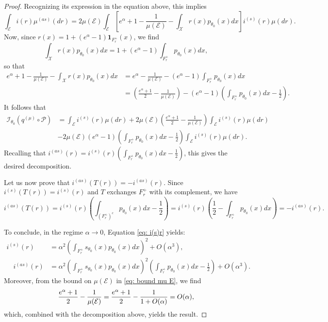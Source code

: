 \documentclass[10pt,a4paper]{amsart}
\newcommand{\modar}{\color{black}}
\begin{document}
\begin{proof}
Recognizing its expression in the equation above, this implies
\[
\int_{\mathcal{E}} i(r) \mu^{(as)}(dr) = 2 \mu(\mathcal{E}) \int_{\mathcal{E}} \left[ e^\alpha + 1 - \frac{1}{\mu(\mathcal{E})} - \int_{\mathcal{X}} r(x) p_{\theta_0}(x) dx \right] i^{(s)}(r) \mu(dr).
\]
Now, since \( r(x) = 1 + (e^\alpha - 1)\mathbf{1}_{F_r^+}(x) \), we find
\[
\int_\mathcal{X} r(x) p_{\theta_0}(x) dx = 1 + (e^\alpha - 1)\int_{F_r^+} p_{\theta_0}(x) dx,
\]
so that
\begin{align*}
e^\alpha + 1 - \frac{1}{\mu(\mathcal{E})} - \int_\mathcal{X} r(x) p_{\theta_0}(x) dx &= e^\alpha - \frac{1}{\mu(\mathcal{E})} - (e^\alpha - 1)\int_{F_r^+} p_{\theta_0}(x) dx \\
&= \left( \frac{e^\alpha + 1}{2} - \frac{1}{\mu(\mathcal{E})} \right) - (e^\alpha - 1)\left( \int_{F_r^+} p_{\theta_0}(x) dx - \frac{1}{2} \right).    
\end{align*}
It follows that
\begin{align*}
\mathcal{I}_{\theta_0}(q^{(\mu)} \circ \mathcal{P})& = \int_{\mathcal{E}} i^{(s)}(r) \mu(dr) + 2 \mu(\mathcal{E}) \left( \frac{e^\alpha + 1}{2} - \frac{1}{\mu(\mathcal{E})} \right) \int_{\mathcal{E}} i^{(s)}(r) \mu(dr) \\
& - 2 \mu(\mathcal{E})(e^\alpha - 1)\left( \int_{F_r^+} p_{\theta_0}(x) dx - \frac{1}{2} \right) \int_{\mathcal{E}} i^{(s)}(r) \mu(dr).
\end{align*}
Recalling that \( i^{(as)}(r) = i^{(s)}(r) \left( \int_{F_r^+} p_{\theta_0}(x) dx - \frac{1}{2} \right) \), this gives the desired decomposition.

Let us now prove that \( i^{(as)}(T(r)) = -i^{(as)}(r) \). Since \( i^{(s)}(T(r)) = i^{(s)}(r) \) and \( T \) exchanges \( F_r^+ \) with its complement, we have
\[
i^{(as)}(T(r)) = i^{(s)}(r) \left( \int_{(F_r^+)^c} p_{\theta_0}(x) dx - \frac{1}{2} \right) = i^{(s)}(r) \left(\frac{1}{2} - \int_{F_r^+} p_{\theta_0}(x) dx \right) = - i^{(as)}(r).
\]

To conclude, in the regime \( \alpha \to 0 \), Equation \eqref{eq: i(s)r} yields:
{\modar
	\begin{align*}
 i^{(s)}(r) &= \alpha^2 \left( \int_{F_r^+} s_{\theta_0}(x) p_{\theta_0}(x) dx \right)^2 + O(\alpha^3),
\\ 
\quad i^{(as)}(r) &=\alpha^2 \left( \int_{F_r^+} s_{\theta_0}(x) p_{\theta_0}(x) dx \right)^2 \left( \int_{F_r^+} p_{\theta_0}(x) dx - \frac{1}{2} \right)+O(\alpha^3).
\end{align*}}
Moreover, from the bound on \( \mu(\mathcal{E}) \) in \eqref{eq: bound mu E}, we find
\[{\modar
\frac{e^\alpha + 1}{2} - \frac{1}{\mu(\mathcal{E})} 
=\frac{e^\alpha + 1}{2} - \frac{1}{1+O(\alpha)}=O(\alpha), }
\]
which, combined with the decomposition above, yields the result.
\end{proof}
\end{document}
